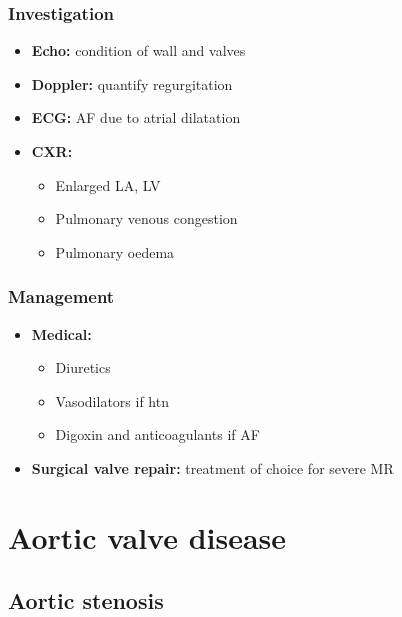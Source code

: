 \documentclass[
  12pt,
]{memoir}
\providecommand{\tightlist}{%
  \setlength{\itemsep}{0pt}\setlength{\parskip}{0pt}}
\begin{document}
\hypertarget{investigation-10}{%
\subsubsection{Investigation}\label{investigation-10}}

\begin{itemize}
\tightlist
\item
  \textbf{Echo:} condition of wall and valves
\item
  \textbf{Doppler:} quantify regurgitation
\item
  \textbf{ECG:} AF due to atrial dilatation
\item
  \textbf{CXR:}

  \begin{itemize}
  \tightlist
  \item
    Enlarged LA, LV
  \item
    Pulmonary venous congestion
  \item
    Pulmonary oedema
  \end{itemize}
\end{itemize}

\hypertarget{management-11}{%
\subsubsection{Management}\label{management-11}}

\begin{itemize}
\tightlist
\item
  \textbf{Medical:}

  \begin{itemize}
  \tightlist
  \item
    Diuretics
  \item
    Vasodilators if htn
  \item
    Digoxin and anticoagulants if AF
  \end{itemize}
\item
  \textbf{Surgical valve repair:} treatment of choice for severe MR
\end{itemize}

\hypertarget{aortic-valve-disease}{%
\section{Aortic valve disease}\label{aortic-valve-disease}}

\hypertarget{aortic-stenosis}{%
\subsection{Aortic stenosis}\label{aortic-stenosis}}
\end{document}
